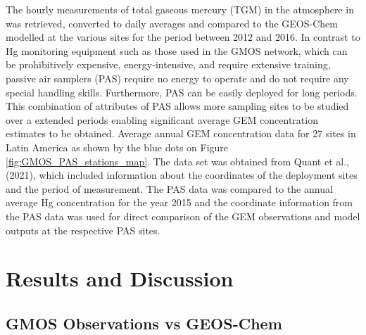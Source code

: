 \begin{flushleft}
The hourly measurements of total gaseous mercury (TGM) in the atmosphere in \nang was retrieved, converted to daily averages and compared to the GEOS-Chem modelled \hg at the various sites for the period between 2012 and 2016. In contrast to Hg monitoring equipment such as those used in the GMOS network, which can be prohibitively expensive, energy-intensive, and require extensive training, passive air samplers (PAS) require no energy to operate and do not require any special handling skills. Furthermore, PAS can be easily deployed for long periods. This combination of attributes of PAS allows more sampling sites to be studied over a extended periods enabling significant average GEM concentration estimates to be obtained. Average annual GEM concentration data for 27 sites in Latin America as shown by the blue dots on Figure  \ref{fig:GMOS_PAS_stations_map}. The data set was obtained from Quant et al., (2021), which included information about the coordinates of the deployment sites and the period of measurement\cite{quant_measuring_2021}. The PAS data was compared to the annual average Hg concentration for the year 2015 and the coordinate information from the PAS data was used for direct comparison of the GEM observations and model outputs at the respective PAS sites.
\end{flushleft}


\section{Results and Discussion}
\subsection{GMOS Observations vs GEOS-Chem}

